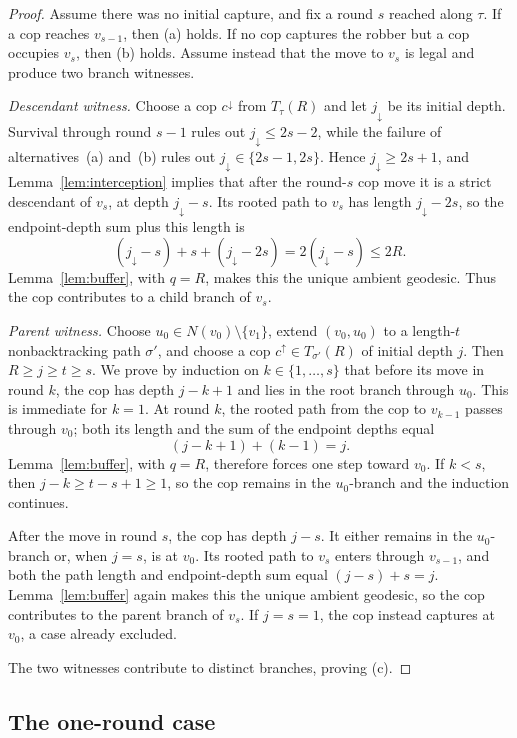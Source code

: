 \documentclass[11pt]{amsart}
\theoremstyle{definition}
\begin{document}
\begin{proof}
Assume there was no initial capture, and fix a round $s$ reached along $\tau$. If a cop reaches $v_{s-1}$, then (a) holds. If no cop captures the robber but a cop occupies $v_s$, then (b) holds. Assume instead that the move to $v_s$ is legal and produce two branch witnesses.

\emph{Descendant witness.}
Choose a cop $c^\downarrow$ from $T_\tau(R)$ and let $j_\downarrow$ be its initial depth. Survival through round $s-1$ rules out $j_\downarrow\leq2s-2$, while the failure of alternatives~(a) and~(b) rules out $j_\downarrow\in\{2s-1,2s\}$. Hence $j_\downarrow\geq2s+1$, and Lemma~\ref{lem:interception} implies that after the round-$s$ cop move it is a strict descendant of $v_s$, at depth $j_\downarrow-s$. Its rooted path to $v_s$ has length $j_\downarrow-2s$, so the endpoint-depth sum plus this length is
\[
(j_\downarrow-s)+s+(j_\downarrow-2s)
=2(j_\downarrow-s)\leq2R.
\]
Lemma~\ref{lem:buffer}, with $q=R$, makes this the unique ambient geodesic. Thus the cop contributes to a child branch of $v_s$.

\emph{Parent witness.}
Choose $u_0\in N(v_0)\setminus\{v_1\}$, extend $(v_0,u_0)$ to a length-$t$ nonbacktracking path $\sigma'$, and choose a cop $c^\uparrow\in T_{\sigma'}(R)$ of initial depth $j$. Then $R\geq j\geq t\geq s$. We prove by induction on $k\in\{1,\ldots,s\}$ that before its move in round $k$, the cop has depth $j-k+1$ and lies in the root branch through $u_0$. This is immediate for $k=1$. At round $k$, the rooted path from the cop to $v_{k-1}$ passes through $v_0$; both its length and the sum of the endpoint depths equal
\[
(j-k+1)+(k-1)=j.
\]
Lemma~\ref{lem:buffer}, with $q=R$, therefore forces one step toward $v_0$. If $k<s$, then $j-k\geq t-s+1\geq1$, so the cop remains in the $u_0$-branch and the induction continues.

After the move in round $s$, the cop has depth $j-s$. It either remains in the $u_0$-branch or, when $j=s$, is at $v_0$. Its rooted path to $v_s$ enters through $v_{s-1}$, and both the path length and endpoint-depth sum equal $(j-s)+s=j$. Lemma~\ref{lem:buffer} again makes this the unique ambient geodesic, so the cop contributes to the parent branch of $v_s$. If $j=s=1$, the cop instead captures at $v_0$, a case already excluded.

The two witnesses contribute to distinct branches, proving (c).
\end{proof}

\subsection{The one-round case}
\end{document}
